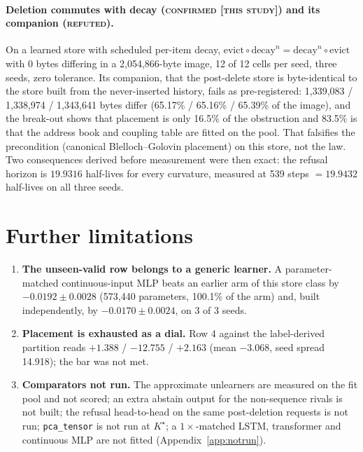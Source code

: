 \documentclass{article} %
\newcommand{\Kstar}{\ensuremath{K^{\star}}}
\begin{document}
\paragraph{Deletion commutes with decay (\textsc{confirmed [this study]}) and its companion
(\textsc{refuted}).} On a learned store with scheduled per-item decay,
$\text{evict}\circ\text{decay}^n=\text{decay}^n\circ\text{evict}$ with 0 bytes differing in a
2,054,866-byte image, 12 of 12 cells per seed, three seeds, zero tolerance.
Its companion, that the post-delete store is byte-identical to the store built from the
never-inserted history, fails as pre-registered: 1,339,083 / 1,338,974 / 1,343,641 bytes differ
(65.17\% / 65.16\% / 65.39\% of the image), and the break-out shows that placement is only 16.5\%
of the obstruction and 83.5\% is that the address book and coupling table are fitted on the pool.
That falsifies the precondition (canonical Blelloch--Golovin placement) on this store, not the
law. Two consequences derived before measurement were then exact: the refusal horizon is $19.9316$
half-lives for every curvature, measured at 539 steps $=19.9432$ half-lives on all three seeds.


\section{Further limitations}
\label{app:morelimits}
\begin{enumerate}[leftmargin=*,itemsep=1pt]
\item \textbf{The unseen-valid row belongs to a generic learner.} A parameter-matched
  continuous-input MLP beats an earlier arm of this store class by $-0.0192\pm0.0028$ (573,440
  parameters, 100.1\% of the arm) and, built independently, by $-0.0170\pm0.0024$, on 3 of 3
  seeds. %
\item \textbf{Placement is exhausted as a dial.} Row 4 against the label-derived partition reads
  $+1.388$ / $-12.755$ / $+2.163$ (mean $-3.068$, seed spread 14.918); the bar was not met.
\item \textbf{Comparators not run.} The approximate unlearners are measured on the fit pool and
  not scored; an extra abstain output for the non-sequence rivals is not built; the refusal
  head-to-head on the same post-deletion requests is not run; \texttt{pca\_tensor} is not run at
  $\Kstar$; a $1\times$-matched LSTM, transformer and continuous MLP are not fitted
  (Appendix~\ref{app:notrun}).
\end{enumerate}
\end{document}
